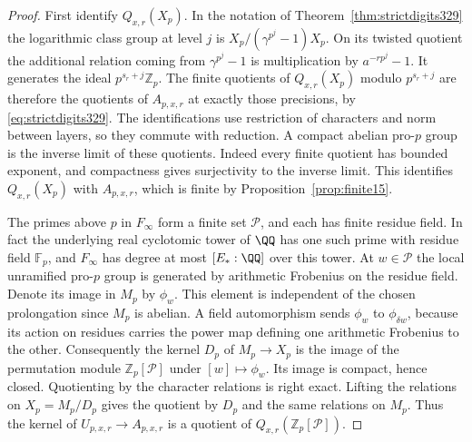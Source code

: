 \documentclass[a4paper,11pt]{article}
\theoremstyle{definition}
\theoremstyle{remark}
\newcommand{\ZZ}{\mathbb Z}\newcommand{\ord}{\operatorname{ord}}
\numberwithin{equation}{section}
\begin{document}
\begin{proof}
First identify \(Q_{x,r}(X_p)\). In the notation of
Theorem~\ref{thm:strictdigits329} the logarithmic class group
at level \(j\) is \(X_p/(\gamma^{p^j}-1)X_p\).
On its twisted quotient the additional relation coming from
\(\gamma^{p^j}-1\) is multiplication by \(a^{-rp^j}-1\).
It generates the ideal \(p^{s_r+j}\ZZ_p\). The finite quotients
of \(Q_{x,r}(X_p)\) modulo \(p^{s_r+j}\) are therefore the
quotients of \(A_{p,x,r}\) at exactly those precisions,
by \eqref{eq:strictdigits329}. The identifications use restriction
of characters and norm between layers, so they commute with
reduction. A compact abelian pro-\(p\) group is the inverse limit
of these quotients. Indeed every finite quotient has bounded
exponent, and compactness gives surjectivity to the inverse limit.
This identifies \(Q_{x,r}(X_p)\) with \(A_{p,x,r}\), which is finite
by Proposition~\ref{prop:finite15}.

The primes above \(p\) in \(F_\infty\) form a finite set \(\mathcal P\),
and each has finite residue field. In fact the underlying real
cyclotomic tower of \(\QQ\) has one such prime with residue
field \(\mathbb F_p\), and \(F_\infty\) has degree at most
\([E_*:\QQ]\) over this tower. At \(w\in\mathcal P\) the local
unramified pro-\(p\) group is generated by arithmetic Frobenius
on the residue field. Denote its image in \(M_p\) by \(\phi_w\).
This element is independent of the chosen prolongation since
\(M_p\) is abelian. A field automorphism sends \(\phi_w\) to
\(\phi_{\delta w}\), because its action on residues carries the
power map defining one arithmetic Frobenius to the other.
Consequently the kernel \(D_p\) of \(M_p\to X_p\) is the image
of the permutation module \(\ZZ_p[\mathcal P]\) under
\([w]\mapsto\phi_w\). Its image is compact, hence closed.
Quotienting by the character relations is right exact. Lifting
the relations on \(X_p=M_p/D_p\) gives the quotient by \(D_p\)
and the same relations on \(M_p\). Thus the kernel of
\(U_{p,x,r}\to A_{p,x,r}\) is a quotient of
\(Q_{x,r}(\ZZ_p[\mathcal P])\).


\end{proof}
\end{document}
